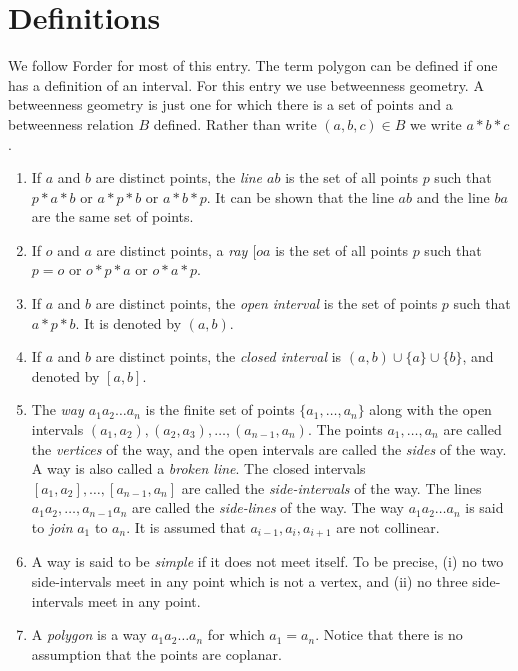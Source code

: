 \documentclass[12pt]{article}
\begin{document}

\section{Definitions}
We follow Forder \cite{forder} for most of this entry.
The term polygon can be defined if  one has a definition of an interval. For this 
entry we use betweenness geometry. A betweenness geometry
is just one for which there is a set of points and a betweenness relation $B$ defined.
Rather than write $(a,b,c) \in B$ we write $a*b*c$.

\begin{enumerate}
\item If $a$ and $b$ are distinct points, the \emph{line $ab$} is the set of
all points $p$ such that $p*a*b$ or $a*p*b$ or $a*b*p$. It can be shown
that the line $ab$ and the line $ba$ are the same set of points. 
\item If $o$ and $a$ are distinct points, a \emph{ray $[oa$} is the set of all points $p$ such that 
$p=o$ or $o*p*a$ or $o*a*p$. 
\item If $a$ and $b$ are distinct points, the \emph{open interval} is the set of points
$p$ such that $a*p*b$. It is denoted by $(a,b).$
\item If $a$ and $b$ are distinct points, the \emph{closed interval} is 
$(a,b) \cup \{a\} \cup \{b\}$, and denoted by $[a,b].$
\item The \emph{way $a_1a_2\ldots a_n$} is the finite set of points $\{a_1, \ldots , a_n\}$
along with the open intervals $(a_1, a_2), (a_2,a_3), \ldots, (a_{n-1}, a_n)$.
The points $a_1, \ldots, a_n$ are called the \emph{vertices} of the way, and the
open intervals are called the \emph{sides} of the way. 
A way is also called a \emph{broken line}.
The closed intervals $[a_1,a_2], \ldots, [a_{n-1},a_n]$ are called the \emph{side-intervals} of
the way. The lines $a_1a_2, \ldots , a_{n-1}a_n$ are called the \emph{side-lines}
of the way. 
The way  $a_1a_2\ldots a_n$ is said to \emph{join} $a_1$ to $a_n$.
It is assumed that $a_{i-1}, a_i, a_{i+1}$ are not collinear. 
\item A way is said to be \emph{simple} if it does not meet itself. To be precise,
(i) no two side-intervals meet in any point which is not a vertex, and (ii) no three side-intervals
meet in any point. 
\item A \emph{polygon} is a way $a_1 a_2 \ldots a_n$ for which $a_1 = a_n$. Notice that there is
no assumption that the points are coplanar. 

\end{enumerate}
\end{document}
